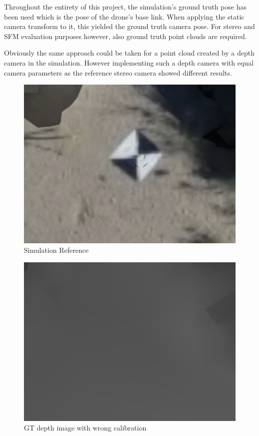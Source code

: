 Throughout the entirety of this project, the simulation's ground truth pose has been used which is the pose of the drone's base link. When applying the static camera transform to it, this yielded the ground truth camera pose. For stereo and SFM evaluation purposes however, also ground truth point clouds are required. 

Obviously the same approach could be taken for a point cloud created by a depth camera in the simulation. However implementing such a depth camera with equal camera parameters as the reference stereo camera showed different results.


\begin{figure}[ht]
    \centering
    \includegraphics[scale=0.4]{images/preparation/GT_error_sim.png}
    \caption{Simulation Reference}
    \label{fig:GT_error_sim}
\end{figure}
\begin{figure}
    \centering
    \includegraphics[scale=0.4]{images/preparation/GT_error_GT.png}
    \caption{GT depth image with wrong calibration}
    \label{fig:GT_error_GT}
\end{figure}

